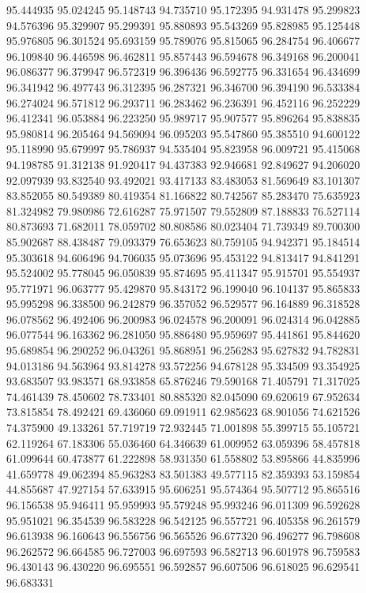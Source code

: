 95.444935
95.024245
95.148743
94.735710
95.172395
94.931478
95.299823
94.576396
95.329907
95.299391
95.880893
95.543269
95.828985
95.125448
95.976805
96.301524
95.693159
95.789076
95.815065
96.284754
96.406677
96.109840
96.446598
96.462811
95.857443
96.594678
96.349168
96.200041
96.086377
96.379947
96.572319
96.396436
96.592775
96.331654
96.434699
96.341942
96.497743
96.312395
96.287321
96.346700
96.394190
96.533384
96.274024
96.571812
96.293711
96.283462
96.236391
96.452116
96.252229
96.412341
96.053884
96.223250
95.989717
95.907577
95.896264
95.838835
95.980814
96.205464
94.569094
96.095203
95.547860
95.385510
94.600122
95.118990
95.679997
95.786937
94.535404
95.823958
96.009721
95.415068
94.198785
91.312138
91.920417
94.437383
92.946681
92.849627
94.206020
92.097939
93.832540
93.492021
93.417133
83.483053
81.569649
83.101307
83.852055
80.549389
80.419354
81.166822
80.742567
85.283470
75.635923
81.324982
79.980986
72.616287
75.971507
79.552809
87.188833
76.527114
80.873693
71.682011
78.059702
80.808586
80.023404
71.739349
89.700300
85.902687
88.438487
79.093379
76.653623
80.759105
94.942371
95.184514
95.303618
94.606496
94.706035
95.073696
95.453122
94.813417
94.841291
95.524002
95.778045
96.050839
95.874695
95.411347
95.915701
95.554937
95.771971
96.063777
95.429870
95.843172
96.199040
96.104137
95.865833
95.995298
96.338500
96.242879
96.357052
96.529577
96.164889
96.318528
96.078562
96.492406
96.200983
96.024578
96.200091
96.024314
96.042885
96.077544
96.163362
96.281050
95.886480
95.959697
95.441861
95.844620
95.689854
96.290252
96.043261
95.868951
96.256283
95.627832
94.782831
94.013186
94.563964
93.814278
93.572256
94.678128
95.334509
93.354925
93.683507
93.983571
68.933858
65.876246
79.590168
71.405791
71.317025
74.461439
78.450602
78.733401
80.885320
82.045090
69.620619
67.952634
73.815854
78.492421
69.436060
69.091911
62.985623
68.901056
74.621526
74.375900
49.133261
57.719719
72.932445
71.001898
55.399715
55.105721
62.119264
67.183306
55.036460
64.346639
61.009952
63.059396
58.457818
61.099644
60.473877
61.222898
58.931350
61.558802
53.895866
44.835996
41.659778
49.062394
85.963283
83.501383
49.577115
82.359393
53.159854
44.855687
47.927154
57.633915
95.606251
95.574364
95.507712
95.865516
96.156538
95.946411
95.959993
95.579248
95.993246
96.011309
96.592628
95.951021
96.354539
96.583228
96.542125
96.557721
96.405358
96.261579
96.613938
96.160643
96.556756
96.565526
96.677320
96.496277
96.798608
96.262572
96.664585
96.727003
96.697593
96.582713
96.601978
96.759583
96.430143
96.430220
96.695551
96.592857
96.607506
96.618025
96.629541
96.683331
